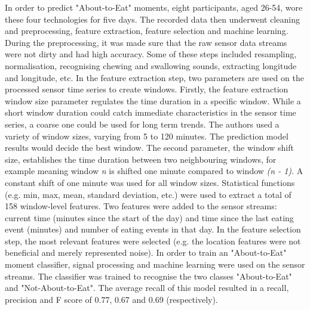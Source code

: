 
In order to predict "About-to-Eat" moments, eight participants, aged 26-54, wore these four technologies for five days. The recorded data then underwent cleaning and preprocessing, feature extraction, feature selection and machine learning. During the preprocessing, it was made sure that the raw sensor data streams were not dirty and had high accuracy. Some of these steps included resampling, normalisation, recognising chewing and swallowing sounds, extracting longitude and longitude, etc. 
In the feature extraction step, two parameters are used on the processed sensor time series to create windows. Firstly, the feature extraction window size parameter regulates the time duration in a specific window. While a short window duration could catch immediate characteristics in the sensor time series, a coarse one could be used for long term trends. The authors used a variety of window sizes, varying from 5 to 120 minutes. The prediction model results would decide the best window. The second parameter, the window shift size, establishes the time duration between two neighbouring windows, for example meaning window \textit{n} is shifted one minute compared to window \textit{(n - 1)}. A constant shift of one minute was used for all window sizes. Statistical functions (e.g. min, max, mean, standard deviation, etc.) were used to extract a total of 158 window-level features. Two features were added to the sensor streams: current time (minutes since the start of the day) and time since the last eating event (minutes) and number of eating events in that day.
In the feature selection step, the most relevant features were selected (e.g. the location features were not beneficial and merely represented noise).
In order to train an "About-to-Eat" moment classifier, signal processing and machine learning were used on the sensor streams. The classifier was trained to recognise the two classes "About-to-Eat" and "Not-About-to-Eat".  The average recall of this model resulted in a recall, precision and F score of 0.77, 0.67 and 0.69 (respectively).

